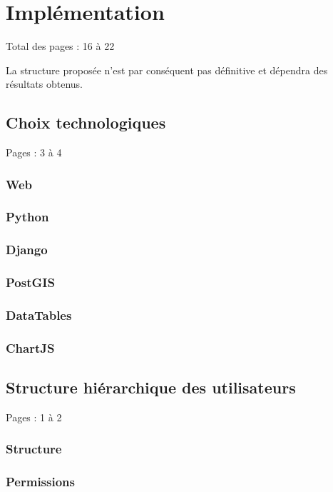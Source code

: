 \documentclass{eplmastersthesis_FR}
\begin{document}
	\chapter{Implémentation}

		Total des pages : 16 à 22

		La structure proposée n'est par conséquent pas définitive et dépendra des résultats obtenus.

		\section{Choix technologiques}

			Pages : 3 à 4

			\subsection*{Web}
			\subsection*{Python}
			\subsection*{Django}
			\subsection*{PostGIS}
			\subsection*{DataTables}
			\subsection*{ChartJS}

		\section{Structure hiérarchique des utilisateurs}

			Pages : 1 à 2

			\subsection*{Structure}
			\subsection*{Permissions}
\end{document}
